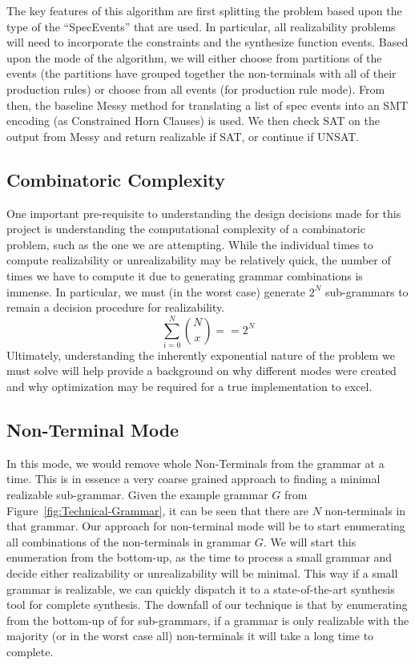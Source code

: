 \documentclass[acmsmall, nonacm]{acmart}
\begin{document}
The key features of this algorithm are first splitting the problem based upon the 
type of the ``SpecEvents'' that are used. In particular, all realizability problems will need to incorporate the constraints and the synthesize function events. Based upon the mode of the algorithm, we will either
choose from partitions of the events (the partitions have grouped together the non-terminals with all of their production rules) or choose from all events (for production rule mode).
From then, the baseline Messy method for translating a list of spec events into an SMT encoding (as Constrained Horn Clauses) is used. We then check SAT on the output from Messy and return realizable if SAT, or continue if UNSAT.

\subsection{Combinatoric Complexity}
One important pre-requisite to understanding the design decisions made for this project is understanding the computational complexity of a combinatoric problem, such as the one we are attempting.
While the individual times to compute realizability or unrealizability may be
relatively quick, the number of times we have to compute it due to
generating grammar combinations is immense.
In particular, we must (in the worst case) generate $2^N$ sub-grammars to
remain a decision procedure for realizability.
$$\sum_{i = 0}^{N} {N \choose x} == 2^N$$
Ultimately, understanding the inherently exponential nature of the problem
we must solve will help provide a background on why different modes were created
and why optimization may be required for a true implementation to excel.


\subsection{Non-Terminal Mode}
In this mode, we would remove whole Non-Terminals from the grammar at a time.
This is in essence a very coarse grained approach to finding a minimal
realizable sub-grammar. Given the example grammar $G$ from Figure~\ref{fig:Technical-Grammar}, it can be seen that there are $N$ non-terminals in
that grammar.
Our approach for non-terminal mode will be to start enumerating all combinations
of the non-terminals in grammar $G$. We will start this enumeration from the bottom-up, as the time to process a small grammar and decide either
realizability or unrealizability will be minimal. This way if a small grammar
is realizable, we can quickly dispatch it to a state-of-the-art synthesis tool
for complete synthesis. The downfall of our technique is that by enumerating from the bottom-up of for sub-grammars, if a grammar is only realizable with the majority (or in the worst case all) non-terminals it will take a long time to complete.
\end{document}

